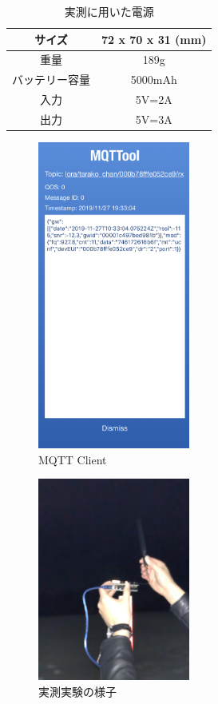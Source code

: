 \begin{table}[]
    \caption{実測に用いた電源}\label{fig:LoRaWAN_Battery}
    \centering
    \begin{tabular}{|c|c|}
    \hline
    サイズ     & 72 x 70 x 31 (mm) \\ \hline
    重量      & 189g              \\ \hline
    バッテリー容量 & 5000mAh           \\ \hline
    入力      & 5V=2A             \\ \hline
    出力      & 5V=3A             \\ \hline
    \end{tabular}
\end{table}

\begin{figure}[]
    \begin{center}
    \includegraphics[width=5cm]{figures/mqtt.PNG}
    \caption{MQTT Client}
    \label{fig:mqtt}
    \end{center}
\end{figure}

\begin{figure}[]
    \begin{center}
    \includegraphics[width=5cm]{figures/experiment.jpg}
    \caption{実測実験の様子}
    \label{fig:experiment}
    \end{center}
\end{figure}

